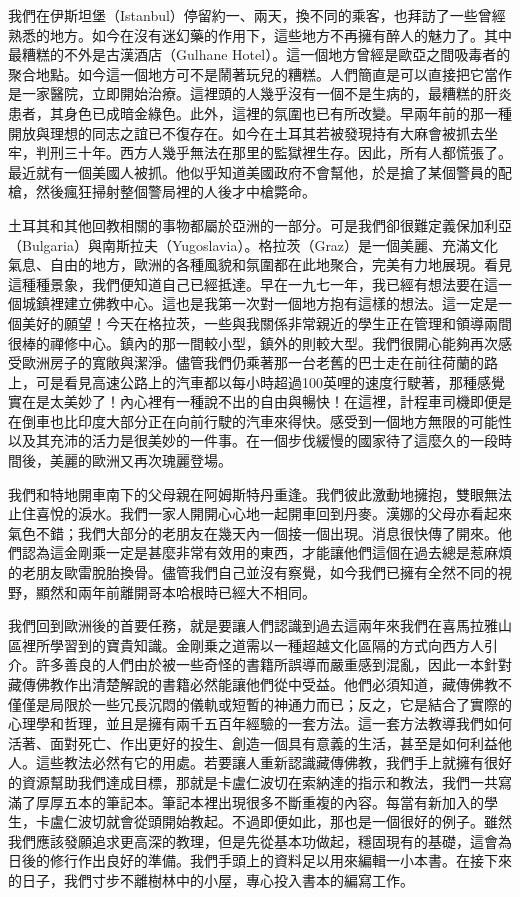 我們在伊斯坦堡（Istanbul）停留約一、兩天，換不同的乘客，也拜訪了一些曾經熟悉的地方。如今在沒有迷幻藥的作用下，這些地方不再擁有醉人的魅力了。其中最糟糕的不外是古漢酒店（Gulhane
Hotel）。這一個地方曾經是歐亞之間吸毒者的聚合地點。如今這一個地方可不是鬧著玩兒的糟糕。人們簡直是可以直接把它當作是一家醫院，立即開始治療。這裡頭的人幾乎沒有一個不是生病的，最糟糕的肝炎患者，其身色已成暗金綠色。此外，這裡的氛圍也已有所改變。早兩年前的那一種開放與理想的同志之誼已不復存在。如今在土耳其若被發現持有大麻會被抓去坐牢，判刑三十年。西方人幾乎無法在那里的監獄裡生存。因此，所有人都慌張了。最近就有一個美國人被抓。他似乎知道美國政府不會幫他，於是搶了某個警員的配槍，然後瘋狂掃射整個警局裡的人後才中槍斃命。

土耳其和其他回教相關的事物都屬於亞洲的一部分。可是我們卻很難定義保加利亞（Bulgaria）與南斯拉夫（Yugoslavia）。格拉茨（Graz）是一個美麗、充滿文化氣息、自由的地方，歐洲的各種風貌和氛圍都在此地聚合，完美有力地展現。看見這種種景象，我們便知道自己已經抵達。早在一九七一年，我已經有想法要在這一個城鎮裡建立佛教中心。這也是我第一次對一個地方抱有這樣的想法。這一定是一個美好的願望！今天在格拉茨，一些與我關係非常親近的學生正在管理和領導兩間很棒的禪修中心。鎮內的那一間較小型，鎮外的則較大型。我們很開心能夠再次感受歐洲房子的寬敞與潔淨。儘管我們仍乘著那一台老舊的巴士走在前往荷蘭的路上，可是看見高速公路上的汽車都以每小時超過100英哩的速度行駛著，那種感覺實在是太美妙了！內心裡有一種說不出的自由與暢快！在這裡，計程車司機即便是在倒車也比印度大部分正在向前行駛的汽車來得快。感受到一個地方無限的可能性以及其充沛的活力是很美妙的一件事。在一個步伐緩慢的國家待了這麼久的一段時間後，美麗的歐洲又再次瑰麗登場。

我們和特地開車南下的父母親在阿姆斯特丹重逢。我們彼此激動地擁抱，雙眼無法止住喜悅的淚水。我們一家人開開心心地一起開車回到丹麥。漢娜的父母亦看起來氣色不錯；我們大部分的老朋友在幾天內一個接一個出現。消息很快傳了開來。他們認為這金剛乘一定是甚麼非常有效用的東西，才能讓他們這個在過去總是惹麻煩的老朋友歐雷脫胎換骨。儘管我們自己並沒有察覺，如今我們已擁有全然不同的視野，顯然和兩年前離開哥本哈根時已經大不相同。

我們回到歐洲後的首要任務，就是要讓人們認識到過去這兩年來我們在喜馬拉雅山區裡所學習到的寶貴知識。金剛乗之道需以一種超越文化區隔的方式向西方人引介。許多善良的人們由於被一些奇怪的書籍所誤導而嚴重感到混亂，因此一本針對藏傳佛教作出清楚解說的書籍必然能讓他們從中受益。他們必須知道，藏傳佛教不僅僅是局限於一些冗長沉悶的儀軌或短暫的神通力而已；反之，它是結合了實際的心理學和哲理，並且是擁有兩千五百年經驗的一套方法。這一套方法教導我們如何活著、面對死亡、作出更好的投生、創造一個具有意義的生活，甚至是如何利益他人。這些教法必然有它的用處。若要讓人重新認識藏傳佛教，我們手上就擁有很好的資源幫助我們達成目標，那就是卡盧仁波切在索納達的指示和教法，我們一共寫滿了厚厚五本的筆記本。筆記本裡出現很多不斷重複的內容。每當有新加入的學生，卡盧仁波切就會從頭開始教起。不過即便如此，那也是一個很好的例子。雖然我們應該發願追求更高深的教理，但是先從基本功做起，穩固現有的基礎，這會為日後的修行作出良好的準備。我們手頭上的資料足以用來編輯一小本書。在接下來的日子，我們寸步不離樹林中的小屋，專心投入書本的編寫工作。


